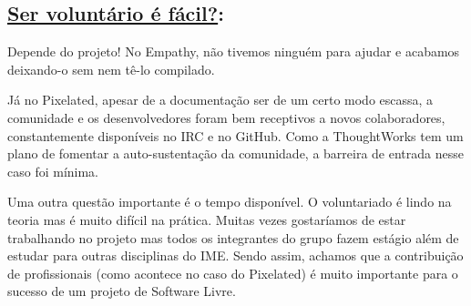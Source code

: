 \subsection*{\underline{Ser voluntário é fácil?}:}
Depende do projeto! No Empathy, não tivemos ninguém para ajudar e acabamos
deixando-o sem nem tê-lo compilado.

Já no Pixelated, apesar de a documentação ser de um certo modo escassa, a
comunidade e os desenvolvedores foram bem receptivos a novos colaboradores,
constantemente disponíveis no IRC e no GitHub. Como a ThoughtWorks tem um plano
de fomentar a auto-sustentação da comunidade, a barreira de entrada nesse caso
foi mínima.

Uma outra questão importante é o tempo disponível. O voluntariado é lindo na
teoria mas é muito difícil na prática. Muitas vezes gostaríamos de estar
trabalhando no projeto mas todos os integrantes do grupo fazem estágio além de
estudar para outras disciplinas do IME. Sendo assim, achamos que a
contribuição de profissionais (como acontece no caso do Pixelated) é muito
importante para o sucesso de um projeto de Software Livre.